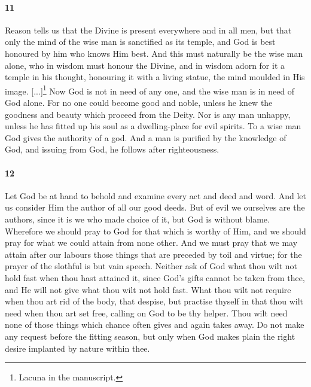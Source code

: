 \documentclass{article}
\begin{document}
\paragraph{11} Reason tells us that the Divine is present everywhere and in all men, but that only the mind of the wise man is sanctified as its temple, and God is best honoured by him who knows Him best. And this must naturally be the wise man alone, who in wisdom must honour the Divine, and in wisdom adorn for it a temple in his thought, honouring it with a living statue, the mind moulded in His image. [...]\footnote{Lacuna in the manuscript.} Now God is not in need of any one, and the wise man is in need of God alone. For no one could become good and noble, unless he knew the goodness and beauty which proceed from the Deity. Nor is any man unhappy, unless he has fitted up his soul as a dwelling-place for evil spirits. To a wise man God gives the authority of a god. And a man is purified by the knowledge of God, and issuing from God, he follows after righteousness.

\paragraph{12} Let God be at hand to behold and examine every act and deed and word. And let us consider Him the author of all our good deeds. But of evil we ourselves are the authors, since it is we who made choice of it, but God is without blame. Wherefore we should pray to God for that which is worthy of Him, and we should pray for what we could attain from none other. And we must pray that we may attain after our labours those things that are preceded by toil and virtue; for the prayer of the slothful is but vain speech. Neither ask of God what thou wilt not hold fast when thou hast attained it, since God's gifts cannot be taken from thee, and He will not give what thou wilt not hold fast. What thou wilt not require when thou art rid of the body, that despise, but practise thyself in that thou wilt need when thou art set free, calling on God to be thy helper. Thou wilt need none of those things which chance often gives and again takes away. Do not make any request before the fitting season, but only when God makes plain the right desire implanted by nature within thee.
\end{document}
